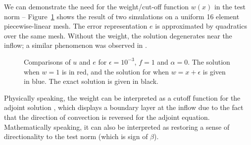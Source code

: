 \documentclass[final,leqno]{siamltex}
\begin{document}
We can demonstrate the need for the weight/cut-off function $w(x)$ in the test norm -- Figure~\ref{fig:comparison1D} shows the result of two simulations on a uniform 16 element piecewise-linear mesh. The error representation $e$ is approximated by quadratics over the same mesh.  Without the weight, the solution degenerates near the inflow; a similar phenomenon was observed in \cite{DahmenVariationalStabilization, DPG2, globalLocalDPG}.  
\begin{figure}[!h]
\centering
{}
\caption{Comparisons of $u$ and $e$ for $\epsilon = 10^{-3}$, $f=1$ and $\alpha = 0$. The solution when $w = 1$ is in red, and the solution for when $w = x+\epsilon$ is given in blue.  The exact solution is given in black.}
\label{fig:comparison1D}
\end{figure}

Physically speaking, the weight can be interpreted as a cutoff function for the adjoint solution \cite{DPGrobustness2}, which displays a boundary layer at the inflow due to the fact that the direction of convection is reversed for the adjoint equation.  Mathematically speaking, it can also be interpreted as restoring a sense of directionality to the test norm (which is  sign of $\beta$).  
\end{document}
